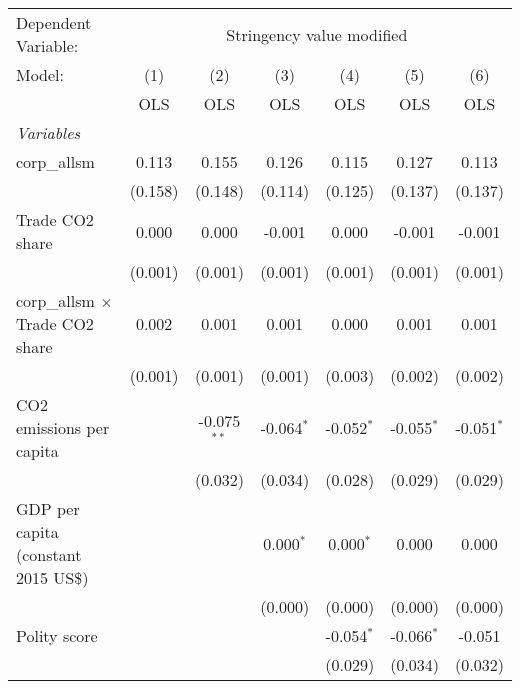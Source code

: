 
\begingroup
\centering
\begin{tabular}{lcccccc}
   \toprule
   Dependent Variable: & \multicolumn{6}{c}{Stringency value modified}\\
   Model:                                 & (1)     & (2)           & (3)          & (4)          & (5)          & (6)\\  
                                          &  OLS    & OLS           & OLS          & OLS          & OLS          & OLS\\  
   \midrule
   \emph{Variables}\\
   corp\_allsm                            & 0.113   & 0.155         & 0.126        & 0.115        & 0.127        & 0.113\\   
                                          & (0.158) & (0.148)       & (0.114)      & (0.125)      & (0.137)      & (0.137)\\   
   Trade CO2 share                        & 0.000   & 0.000         & -0.001       & 0.000        & -0.001       & -0.001\\   
                                          & (0.001) & (0.001)       & (0.001)      & (0.001)      & (0.001)      & (0.001)\\   
   corp\_allsm $\times$ Trade CO2 share   & 0.002   & 0.001         & 0.001        & 0.000        & 0.001        & 0.001\\   
                                          & (0.001) & (0.001)       & (0.001)      & (0.003)      & (0.002)      & (0.002)\\   
   CO2 emissions per capita               &         & -0.075$^{**}$ & -0.064$^{*}$ & -0.052$^{*}$ & -0.055$^{*}$ & -0.051$^{*}$\\   
                                          &         & (0.032)       & (0.034)      & (0.028)      & (0.029)      & (0.029)\\   
   GDP per capita (constant 2015 US\$)    &         &               & 0.000$^{*}$  & 0.000$^{*}$  & 0.000        & 0.000\\   
                                          &         &               & (0.000)      & (0.000)      & (0.000)      & (0.000)\\   
   Polity score                           &         &               &              & -0.054$^{*}$ & -0.066$^{*}$ & -0.051\\   
                                          &         &               &              & (0.029)      & (0.034)      & (0.032)\\   

\end{tabular}
